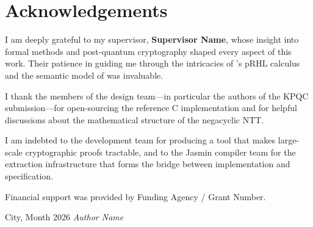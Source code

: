 
\chapter*{Acknowledgements}

I am deeply grateful to my supervisor, \textbf{{Supervisor Name}}, whose
insight into formal methods and post-quantum cryptography shaped every aspect
of this work.  Their patience in guiding me through the intricacies of
\easycrypt{}'s pRHL calculus and the semantic model of \jasmin{} was
invaluable.

I thank the members of the \haetae{} design team---in particular the authors
of the KPQC submission---for open-sourcing the reference C implementation
and for helpful discussions about the mathematical structure of the negacyclic
NTT.

I am indebted to the \easycrypt{} development team for producing a tool that
makes large-scale cryptographic proofs tractable, and to the Jasmin compiler
team for the extraction infrastructure that forms the bridge between
implementation and specification.

Financial support was provided by {Funding Agency / Grant Number}.

\bigskip
\noindent
{City}, {Month} 2026
\hfill
\textit{{Author Name}}
